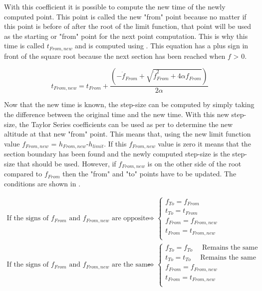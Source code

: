 \noindent
With this coefficient it is possible to compute the new time of the newly computed point. This point is called the new "from" point because no matter if this point is before of after the root of the limit function, that point will be used as the starting or "from" point for the next point computation. This is why this time is called $t_{From,new}$ and is computed using . This equation has a plus sign in front of the square root because the next section has been reached when $f$ > 0.

\begin{equation} \label{eq:tFromNew}
t_{From,new} = t_{From}+\dfrac{\left(-\dot{f}_{From}+\sqrt{\dot{f}_{From}^{2}+4\alpha f_{From}}\right)}{2\alpha}
\end{equation}

\noindent
Now that the new time is known, the step-size can be computed by simply taking the difference between the original time and the new time. With this new step-size, the Taylor Series coefficients can be used as per  to determine the new altitude at that new "from" point. This means that, using  the new limit function value $f_{From,new}$ = $h_{From,new}$-$h_{limit}$. If this $f_{From,new}$ value is zero it means that the section boundary has been found and the newly computed step-size is the step-size that should be used. However, if $f_{From,new}$ is on the other side of the root compared to $f_{From}$ then the "from" and "to" points have to be updated. The conditions are shown in .

\begin{equation}\label{eq:updatedPointsRoot}
\begin{split}
\text{If the signs of }f_{From}\text{ and }f_{From,new}\text{ are opposite}&\Rightarrow\begin{cases}
f_{To}=f_{From}\\
t_{To}=t_{From} \\
f_{From}=f_{From,new}\\
t_{From}=t_{From,new} \\ 
\end{cases}\\
\text{If the signs of }f_{From}\text{ and }f_{From,new}\text{ are the same}&\Rightarrow\begin{cases}
f_{To}=f_{To} \quad \text{  Remains the same}\\
t_{To}=t_{To} \quad \text{  Remains the same}\\
f_{From}=f_{From,new}\\
t_{From}=t_{From,new} \\ 
\end{cases}\\
\end{split}
\end{equation}

